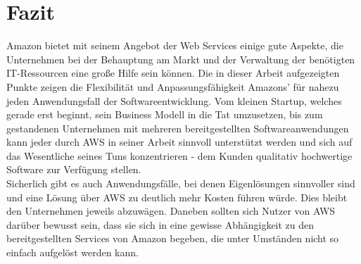\chapter*{Fazit}\label{chapter:fazit}
Amazon bietet mit seinem Angebot der Web Services einige gute Aspekte, die Unternehmen bei der Behauptung am Markt und der Verwaltung der benötigten IT-Ressourcen eine große Hilfe sein können. Die in dieser Arbeit aufgezeigten Punkte zeigen die Flexibilität und Anpassungsfähigkeit Amazons' für nahezu jeden Anwendungsfall der Softwareentwicklung. Vom kleinen Startup, welches gerade erst beginnt, sein Business Modell in die Tat umzusetzen, bis zum gestandenen Unternehmen mit mehreren bereitgestellten Softwareanwendungen kann jeder durch AWS in seiner Arbeit sinnvoll unterstützt werden und sich auf das Wesentliche seines Tuns konzentrieren - dem Kunden qualitativ hochwertige Software zur Verfügung stellen. \\
Sicherlich gibt es auch Anwendungsfälle, bei denen Eigenlösungen sinnvoller sind und eine Lösung über AWS zu deutlich mehr Kosten führen würde. Dies bleibt den Unternehmen jeweils abzuwägen. Daneben sollten sich Nutzer von AWS darüber bewusst sein, dass sie sich in eine gewisse Abhängigkeit zu den bereitgestellten Services von Amazon begeben, die unter Umständen nicht so einfach aufgelöst werden kann.

